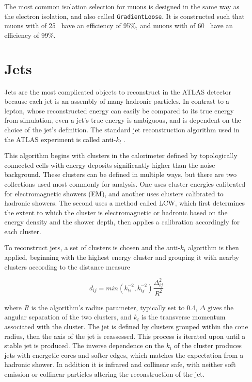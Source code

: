 The most common isolation selection for muons is designed in the same way as the electron isolation, and also called \texttt{GradientLoose}. It is constructed such that muons with \pt of 25 \gev~have an efficiency of 95\%, and muons with \pt of 60 \gev~have an efficiency of 99\%. 

\section{Jets}
\label{sec:reco_jets}

Jets are the most complicated objects to reconstruct in the \ac{ATLAS} detector because each jet is an assembly of many hadronic particles. In contrast to a lepton, whose reconstructed energy can easily be compared to its true energy from simulation, even a jet's true energy is ambiguous, and is dependent on the choice of the jet's definition. The standard jet reconstruction algorithm used in the \ac{ATLAS} experiment is called anti-$k_t$ \cite{Cacciari:2008gp}. 

This algorithm begins with clusters in the calorimeter defined by topologically connected cells with energy deposits significantly higher than the noise background. These clusters can be defined in multiple ways, but there are two collections used most commonly for analysis. One uses cluster energies calibrated for electromagnetic showers (\acs{EM}), and another uses clusters calibrated to hadronic showers. The second uses a method called \ac{LCW}, which first determines the extent to which the cluster is electromagnetic or hadronic based on the energy density and the shower depth, then applies a calibration accordingly for each cluster.

To reconstruct jets, a set of clusters is chosen and the anti-$k_t$ algorithm is then applied, beginning with the highest energy cluster and grouping it with nearby clusters according to the distance measure

\begin{equation}
d_{ij} = min(k^{-2}_{ti}, k^{-2}_{tj}) \frac{\Delta_{ij}^2}{R^2}
\end{equation}

where $R$ is the algorithm's radius parameter, typically set to 0.4, $\Delta$ gives the angular separation of the two clusters, and $k_t$ is the transverse momentum associated with the cluster. The jet is defined by clusters grouped within the cone radius, then the axis of the jet is reassessed. This process is iterated upon until a stable jet is produced. The inverse dependence on the $k_t$ of the cluster produces jets with energetic cores and softer edges, which matches the expectation from a hadronic shower. In addition it is infrared and collinear safe, with neither soft emission or collinear particles altering the reconstruction of the jet. 

